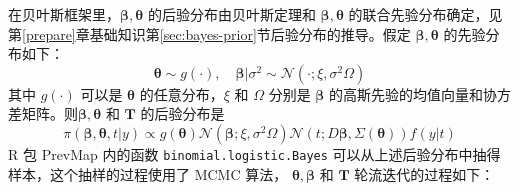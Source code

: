\documentclass[12pt,a4paper,UTF8,twoside]{book}
\theoremstyle{definition}
\theoremstyle{definition}
\theoremstyle{definition}
\theoremstyle{remark}
\begin{document}
在贝叶斯框架里，\(\boldsymbol{\beta}, \boldsymbol{\theta}\)
的后验分布由贝叶斯定理和 \(\boldsymbol{\beta}, \boldsymbol{\theta}\)
的联合先验分布确定，见第\ref{prepare}章基础知识第\ref{sec:bayes-prior}节后验分布的推导。假定
\(\boldsymbol{\beta}, \boldsymbol{\theta}\) 的先验分布如下：
\[ \boldsymbol{\theta} \sim  g(\cdot), \quad \boldsymbol{\beta} | \sigma^2 \sim  \mathcal{N}(\cdot; \xi, \sigma^2 \Omega) \]
\noindent 其中 \(g(\cdot)\) 可以是 \(\boldsymbol{\theta}\)
的任意分布，\(\xi\) 和 \(\Omega\) 分别是 \(\boldsymbol{\beta}\)
的高斯先验的均值向量和协方差矩阵。则\(\boldsymbol{\beta}, \boldsymbol{\theta}\)
和 \(\mathbf{T}\) 的后验分布是 \begin{equation}
\pi(\boldsymbol{\beta}, \boldsymbol{\theta}, t | y) \propto g(\boldsymbol{\theta})\mathcal{N}(\boldsymbol{\beta}; \xi, \sigma^2 \Omega)\mathcal{N}(t; D\boldsymbol{\beta}, \Sigma(\boldsymbol{\theta}))f(y|t) \label{eq:posterior}
\end{equation} \noindent R 包 PrevMap 内的函数
\texttt{binomial.logistic.Bayes}
可以从上述后验分布中抽得样本，这个抽样的过程使用了 MCMC 算法，
\(\boldsymbol{\theta}, \boldsymbol{\beta}\) 和 \(\mathbf{T}\)
轮流迭代的过程如下：
\end{document}
